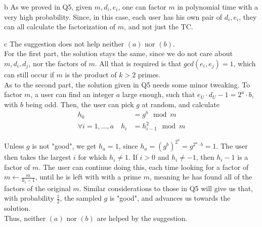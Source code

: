 \documentclass{article}
\begin{document}
\begin{paragraph}
    b As we proved in Q5, given \(m, d_i, e_i\), one can factor \(m\) in polynomial time with a very high probability. Since, in this case, each user has his own pair of \(d_i, e_i\), they can all calculate the factorization of \(m\), and not just the TC.
\end{paragraph}

\begin{paragraph}
    c The suggestion does not help neither \((a)\) nor \((b)\).\\
    
    For the first part, the solution stays the same, since we do not care about \(m, d_i, d_j\), nor the factors of \(m\). All that is required is that \(gcd(e_i, e_j) = 1\), which can still occur if \(m\) is the product of \(k > 2\) primes.\\
    
    As to the second part, the solution given in Q5 needs some minor tweaking. To factor \(m\), a user can find an integer \(a\) large enough, such that \(e_U \cdot d_U - 1 = 2^a \cdot b\), with \(b\) being odd. Then, the user can pick \(g\) at random, and calculate
    \begin{align*}
        h_0 &= g^b \mod{m}\\
        \forall i = 1, ..., a \quad h_i &= h_{i - 1}^2 \mod{m}
    \end{align*}
    
    Unless \(g\) is not "good", we get \(h_a = 1\), since \(h_a = (g^b)^{2^a} = g^{2^a \cdot b} = 1\). The user then takes the largest \(i\) for which \(h_i \neq 1\). If \(i > 0\) and \(h_i \neq -1\), then \(h_i - 1\) is a factor of \(m\). The user can continue doing this, each time looking for a factor of \(m \gets \frac{m}{h_i - 1}\), until he is left with with a prime \(m\), meaning he has found all of the factors of the original \(m\). Similar considerations to those in Q5 will give us that, with probability \(\frac{1}{2}\), the sampled \(g\) is "good", and advances us towards the solution.\\
    
    Thus, neither \((a)\) nor \((b)\) are helped by the suggestion.
\end{paragraph}
\end{document}
